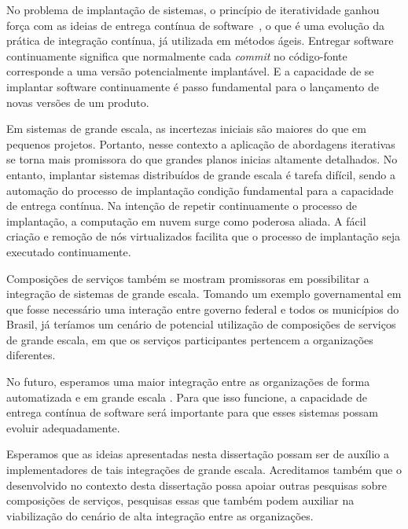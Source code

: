 No problema de implantação de sistemas, o princípio de iteratividade
ganhou força com as ideias de entrega contínua de software~\cite{Humble2011Continuous},
o que é uma evolução da prática de integração contínua, já utilizada em métodos ágeis.
Entregar software continuamente significa que normalmente cada \emph{commit}
no código-fonte corresponde a uma versão potencialmente implantável.
E a capacidade de se implantar software continuamente é passo fundamental
para o lançamento de novas versões de um produto.

Em sistemas de grande escala, as incertezas iniciais são maiores do que
em pequenos projetos. Portanto, nesse contexto a aplicação de abordagens iterativas se torna
mais promissora do que grandes planos inicias altamente detalhados. 
No entanto, implantar sistemas distribuídos de grande escala é tarefa difícil,
sendo a automação do processo de implantação condição fundamental
para a capacidade de entrega contínua.
Na intenção de repetir continuamente o processo de implantação,
a computação em nuvem surge como poderosa aliada.
A fácil criação e remoção de nós virtualizados facilita que o
processo de implantação seja executado continuamente. 


Composições de serviços também se mostram promissoras
em possibilitar a integração de sistemas de grande escala.
Tomando um exemplo governamental em que fosse necessário
uma interação entre governo federal e todos os municípios do Brasil,
já teríamos um cenário de potencial utilização de composições
de serviços de grande escala, em que os serviços participantes
pertencem a organizações diferentes.

No futuro, esperamos uma maior integração entre as organizações 
de forma automatizada e em grande escala .
Para que isso funcione, a capacidade de entrega contínua
de software será importante para que esses sistemas
possam evoluir adequadamente.

Esperamos que as ideias apresentadas nesta dissertação
possam ser de auxílio a implementadores de tais integrações
de grande escala.
Acreditamos também que o \ee desenvolvido no contexto desta dissertação
possa apoiar outras pesquisas sobre composições de serviços, 
pesquisas essas que também podem auxiliar
na viabilização do cenário de alta integração entre as organizações. 


